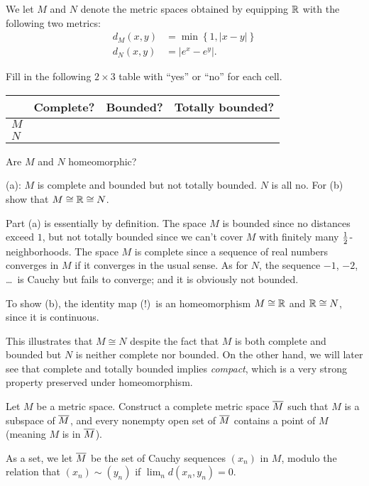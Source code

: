 \begin{problem}
	We let $M$ and $N$ denote the metric spaces obtained
	by equipping $\mathbb R$ with the following two metrics:
	\begin{align*}
		d_M(x,y) &= \min \left\{ 1, \left\lvert x-y \right\rvert \right\} \\
		d_N(x,y) &= \left\lvert e^x - e^y \right\rvert.
	\end{align*}
	\begin{enumerate}[(a)]
		\ii Fill in the following $2 \times 3$ table
		with ``yes'' or ``no'' for each cell.
		\begin{center}
		\begin{tabular}[h]{l|ccc}
			& Complete? & Bounded? & Totally bounded? \\ \hline
			$M$ \\
			$N$ \\
		\end{tabular}
		\end{center}
		\ii Are $M$ and $N$ homeomorphic?
	\end{enumerate}
	\begin{hint}
		(a): $M$ is complete and bounded
		but not totally bounded. $N$ is all no.
		For (b) show that $M \cong \mathbb R \cong N$.
	\end{hint}
	\begin{sol}
		Part (a) is essentially by definition.
		The space $M$ is bounded since no distances exceed $1$,
		but not totally bounded since we can't cover $M$
		with finitely many $\frac{1}{2}$-neighborhoods.
		The space $M$ is complete since a sequence of real
		numbers converges in $M$ if it converges in the usual sense.
		As for $N$, the sequence $-1$, $-2$, \dots\ is Cauchy
		but fails to converge; and it is obviously not bounded.

		To show (b), the identity map (!)\ is an homeomorphism $M \cong \mathbb R$
		and $\mathbb R \cong N$, since it is continuous.

		This illustrates that $M \cong N$ despite the fact
		that $M$ is both complete and bounded
		but $N$ is neither complete nor bounded.
		On the other hand, we will later see that complete
		and totally bounded implies \emph{compact},
		which is a very strong property preserved under homeomorphism.
	\end{sol}
\end{problem}


\begin{dproblem}
	\onechili
	\label{prob:completion}
	Let $M$ be a metric space.
	Construct a complete metric space $\overline M$
	such that $M$ is a subspace of $\overline M$,
	and every nonempty open set of $\overline M$ contains a point of $M$
	(meaning $M$ is  in $\overline M$).
	\begin{hint}
		As a set, we let $\overline M$ be the set of Cauchy
		sequences $(x_n)$ in $M$, modulo the relation that
		$(x_n) \sim (y_n)$ if $\lim_n d(x_n, y_n) = 0$.
	\end{hint}
\end{dproblem}

